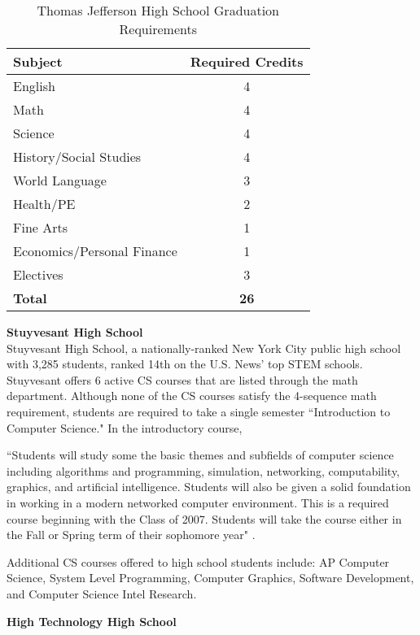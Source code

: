 \begin{table}[]
\centering
\caption{Thomas Jefferson High School Graduation Requirements \cite{tjreq}}
\label{tjtable}
\begin{tabular}{lc}
\textbf{Subject}       & \textbf{Required Credits} \\ \hline
English                & 4                     \\
Math                   & 4                     \\
Science                & 4                     \\
History/Social Studies & 4                     \\
World Language         & 3                     \\
Health/PE              & 2                     \\
Fine Arts              & 1                     \\
Economics/Personal Finance              & 1                     \\ 
Electives              & 3                     \\
\textbf{Total}         & \textbf{26}          
\end{tabular}
\end{table}
\textbf{Stuyvesant High School} \\
Stuyvesant High School, a nationally-ranked New York City public high school with 3,285 students, ranked 14th on the U.S. News' top STEM schools. Stuyvesant offers 6 active CS courses that are listed through the math department. Although none of the CS courses satisfy the 4-sequence math requirement, students are required to take a single semester ``Introduction to Computer Science." In the introductory course, 
\begin{blockquote}``Students will study some the basic themes and subfields of computer science including algorithms and programming, simulation, networking, computability, graphics, and artificial intelligence. Students will also be given a solid foundation in working in a modern networked computer environment. This is a required course beginning with the Class of 2007. Students will take the course either in the Fall or Spring term of their sophomore year" \cite{stuy}.
\end{blockquote} 
Additional CS courses offered to high school students include: AP Computer Science, System Level Programming, Computer Graphics, Software Development, and Computer Science Intel Research. \par
\textbf{High Technology High School} \\
